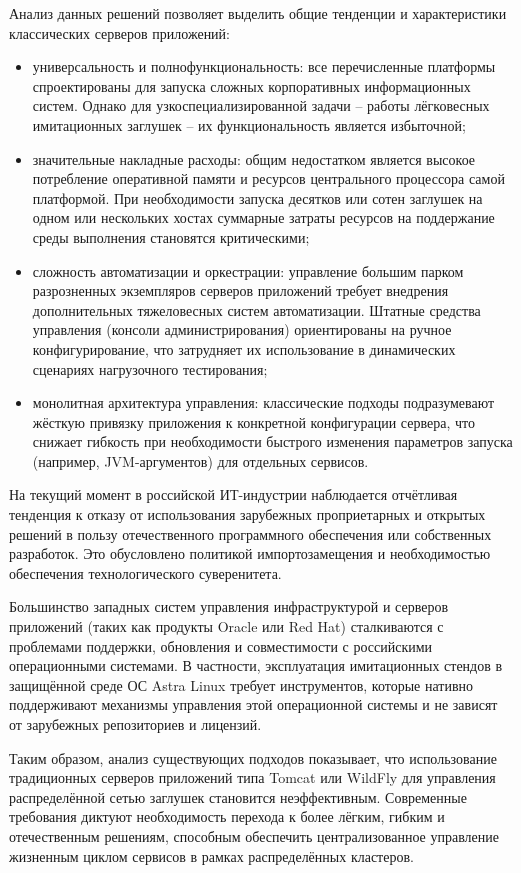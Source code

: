 Анализ данных решений позволяет выделить общие тенденции и характеристики классических серверов приложений:

\begin{itemize}
\item универсальность и полнофункциональность: все перечисленные платформы спроектированы для запуска сложных корпоративных информационных систем. Однако для узкоспециализированной задачи -- работы лёгковесных имитационных заглушек -- их функциональность является избыточной;
\item значительные накладные расходы: общим недостатком является высокое потребление оперативной памяти и ресурсов центрального процессора самой платформой. При необходимости запуска десятков или сотен заглушек на одном или нескольких хостах суммарные затраты ресурсов на поддержание среды выполнения становятся критическими;
\item сложность автоматизации и оркестрации: управление большим парком разрозненных экземпляров серверов приложений требует внедрения дополнительных тяжеловесных систем автоматизации. Штатные средства управления (консоли администрирования) ориентированы на ручное конфигурирование, что затрудняет их использование в динамических сценариях нагрузочного тестирования;
\item монолитная архитектура управления: классические подходы подразумевают жёсткую привязку приложения к конкретной конфигурации сервера, что снижает гибкость при необходимости быстрого изменения параметров запуска (например, JVM-аргументов) для отдельных сервисов.
\end{itemize}

На текущий момент в российской ИТ-индустрии наблюдается отчётливая тенденция к отказу от использования зарубежных проприетарных и открытых решений в пользу отечественного программного обеспечения или собственных разработок. Это обусловлено политикой импортозамещения и необходимостью обеспечения технологического суверенитета.

Большинство западных систем управления инфраструктурой и серверов приложений (таких как продукты Oracle или Red Hat) сталкиваются с проблемами поддержки, обновления и совместимости с российскими операционными системами. В частности, эксплуатация имитационных стендов в защищённой среде ОС Astra Linux требует инструментов, которые нативно поддерживают механизмы управления этой операционной системы и не зависят от зарубежных репозиториев и лицензий.

Таким образом, анализ существующих подходов показывает, что использование традиционных серверов приложений типа Tomcat или WildFly для управления распределённой сетью заглушек становится неэффективным. Современные требования диктуют необходимость перехода к более лёгким, гибким и отечественным решениям, способным обеспечить централизованное управление жизненным циклом сервисов в рамках распределённых кластеров.

